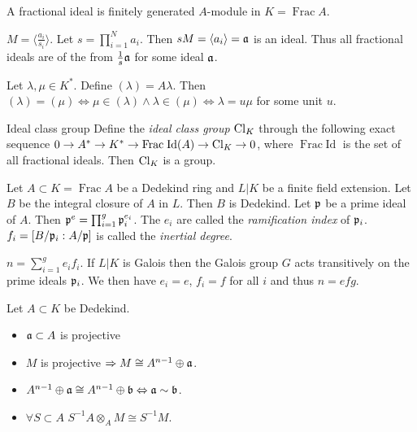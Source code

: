 \documentclass[12pt, a4paper]{article}
\DeclareMathOperator{\Frac}{Frac}
\DeclareMathOperator{\FracId}{Frac\;Id}
\begin{document}
	\begin{Def}{}{}
		A fractional ideal is finitely generated $A$-module in $K = \Frac A$.	
	\end{Def}

	\begin{rem}{}{}
		$M = \langle \frac{a_i}{s_i}\rangle$. Let $s = \prod_{i=1}^{N} a_i$. 
		Then $sM = \langle a_i \rangle = \aa$ is an ideal. Thus 
		all fractional ideals are of the from $\frac{1}{s} \aa$ for some ideal $\aa$.
	\end{rem}

	\begin{rem}{}{}
		Let $\lambda, \mu \in K^*$.	Define $(\lambda) = A\lambda$. 
		Then $(\lambda) = (\mu) \iff \mu \in (\lambda) \land \lambda \in (\mu)
		\iff \lambda = u \mu$ for some unit $u$.
	\end{rem}

	\begin{Def}{Ideal class group}{}
		Define the \emph{ideal class group} $\Cl_K$ through the following 
		exact sequence $0 \to A^* \to K^* \to \FracId(A) \to \Cl_K \to 0$, 
		where $\FracId$ is the set of all fractional ideals. Then $\Cl_K$ is a group.
	\end{Def}


	\begin{Def}{}{}
		Let $A \subset K = \Frac A$ be a Dedekind ring and $L \vert K$ be 
		a finite field extension. Let $B$ be the integral closure of $A$ in 
		$L$. Then $B$ is Dedekind. Let $\pp$ be a prime ideal of $A$. 
		Then $\pp^e = \prod_{i=1}^{g} \pp_i^{e_i}$. The $e_i$ are called 
		the \emph{ramification index} of $\pp_i$. $f_i = [B/\pp_i : A/\pp]$ 
		is called the \emph{inertial degree}.
	\end{Def}

	\begin{thm}{}{}
		$n = \sum_{i=1}^{g} e_if_i$. If $L \vert K$ is Galois then 
		the Galois group $G$ acts transitively on the prime ideals 
		$\pp_i$. We then have $e_i = e$, $f_i = f$ for all $i$ and 
		thus $n =efg$.
	\end{thm}

	\begin{prop}{}{}
		Let $A \subset K$ be Dedekind.
		\begin{itemize}
			\item $\aa \subset A$ is projective
			\item $M$ is projective $\implies M \cong A^{n-1} \oplus \aa$.
			\item $A^{n-1}\oplus \aa \cong A^{n-1} \oplus \bb \iff \aa \sim \bb$.
			\item $\forall S \subset A$ $S^{-1}A \otimes_A M \cong S^{-1}M$.
		\end{itemize}
	\end{prop}
\end{document}

